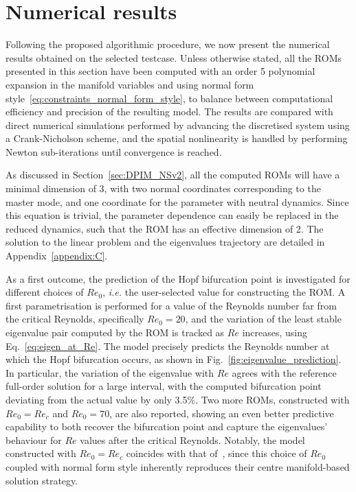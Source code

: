 \documentclass[%
reprint,
superscriptaddress,
 amsmath,amssymb,
 aps,
 pre
]{revtex4-2}
\begin{document}
\section{Numerical results}
\label{sec:numresults}
Following the proposed algorithmic procedure, we now present the numerical results obtained on the selected testcase. Unless otherwise stated, all the ROMs presented in this section have been computed with an order 5 polynomial expansion in the manifold variables and using normal form style~\eqref{eq:constraints_normal_form_style}, to balance between computational efficiency and precision of the resulting model. The results are compared with direct numerical simulations performed by advancing the discretised system using a Crank-Nicholson scheme, and the spatial nonlinearity is handled by performing Newton sub-iterations until convergence is reached.

As discussed in Section~\ref{sec:DPIM_NSv2}, all the computed ROMs will have a minimal dimension of 3, with two normal coordinates corresponding to the master mode, and one coordinate for the parameter with neutral dynamics. Since this equation is trivial, the parameter dependence can easily be replaced in the reduced dynamics, such that the ROM has an effective dimension of 2. The solution to the linear problem and the eigenvalues trajectory are detailed in Appendix~\ref{appendix:C}.

As a first outcome, the prediction of the Hopf bifurcation point is investigated for different choices of $Re_0$, \textit{i.e.} the user-selected value for constructing the ROM.
A first parametrisation is performed for a value of the Reynolds number far from the critical Reynolds, specifically $Re_0 = 20$, and the variation of the least stable eigenvalue pair computed by the ROM is tracked as $Re$ increases, using Eq.~\eqref{eq:eigen_at_Re}. The model precisely predicts the Reynolds number at which the Hopf bifurcation occurs, as shown in Fig.~\ref{fig:eigenvalue_prediction}. In particular, the variation of the eigenvalue with $Re$ agrees with the reference full-order solution for a large interval, with the computed bifurcation point deviating from the actual value by only 3.5\%. Two more ROMs, constructed with $Re_0 = Re_{c}$ and $Re_0 = 70$, are also reported, showing an even better predictive capability to both recover the bifurcation point and capture the eigenvalues' behaviour for $Re$ values after the critical Reynolds. Notably, the model constructed with $Re_0 = Re_{c}$ coincides with that of~\cite{Carini2015}, since this choice of $Re_0$ coupled with normal form style inherently reproduces their centre manifold-based solution strategy.
\end{document}
